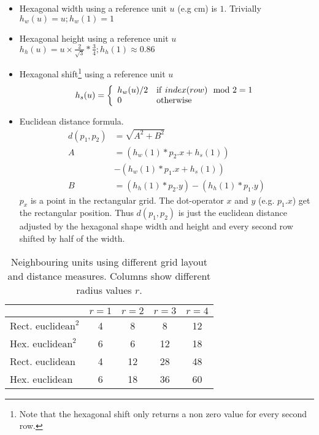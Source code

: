 \documentclass{acm_proc_article-sp}
\begin{document}
\begin{itemize}
    \item Hexagonal width using a reference unit $u$ (e.g cm) is $1$. Trivially
        $ h_w(u) = u; h_w(1) = 1 $
    \item Hexagonal height using a reference unit $u$ \\
        $ h_h(u) = u \times \frac{2}{\sqrt{3}} * \frac{3}{4}; h_h(1) \approx 0.86 $
    \item Hexagonal shift\footnote{Note that the hexagonal shift only returns a non zero
    	value for every second row.} using a reference unit $u$ \\
        \[ h_s(u) = \left\{
               \begin{array} {l l}
                   h_w(u)/2 & \mathrm{if}\ index(row)\mod 2 = 1 \\
                   0 & \mathrm{otherwise}
               \end{array}
               \right.\]
        
    \item Euclidean distance formula. 
    \begin{align*}
        d(p_1,p_2) & = \sqrt{ A^2 + B^2 }\\
        A & = (h_w(1) * p_2.x + h_s(1)) \\
          &- (h_w(1) * p_1.x + h_s(1))\\
        B & = (h_h(1) * p_2.y) - (h_h(1) * p_1.y)
    \end{align*}
    $p_x$ is a point in the rectangular grid. The dot-operator $x$ and $y$
    (e.g. $p_1.x$) get the rectangular position. Thus $d(p_1,p_2)$ is just the
    euclidean distance adjusted by the hexagonal shape width and height
    and every second row shifted by half of the width.
\end{itemize}

\begin{table}
	\centering
	\begin{tabular}{|l|c|c|c|c|}
		\hline
		  & $r=1$& $r=2$ & $r=3$ & $r=4$ \\
		\hline
		Rect. $\mathrm{euclidean}^2$ & 4 & 8 & 8 & 12 \\
		\hline
		Hex. $\mathrm{euclidean}^2$ & 6 & 6 & 12 & 18 \\
		\hline
		\hline
		Rect. $\mathrm{euclidean}$ & 4 & 12 &  28 & 48 \\
		\hline
		Hex. $\mathrm{euclidean}$ & 6 & 18 & 36 & 60 \\
		\hline
	\end{tabular}
	\caption{Neighbouring units using different grid layout and distance measures. Columns show different radius values $r$.}
	\label{tab:neighbours} 
\end{table}
\end{document}

